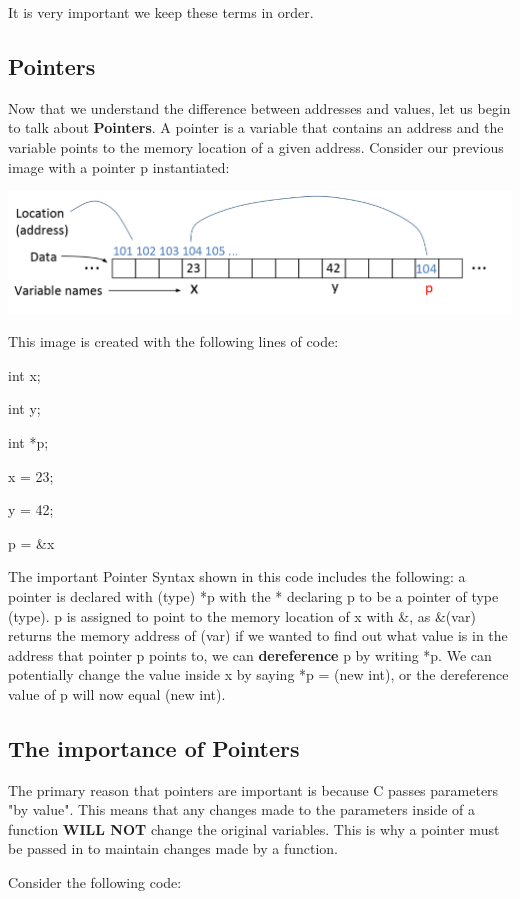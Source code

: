 \documentclass[letterpaper]{article}
\theoremstyle{remark}
\begin{document}
It is very important we keep these terms in order.

\subsection{Pointers}
Now that we understand the difference between addresses and values, let us begin to talk about \textbf{Pointers}. A pointer is a variable that contains an address and the variable points to the memory location of a given address. Consider our previous image with a pointer p instantiated:

\includegraphics[scale=.5]{pointer}

This image is created with the following lines of code:

    int x;

    int y;

    int *p;

    x = 23;

    y = 42;

    p = &x
    
The important Pointer Syntax shown in this code includes the following: a pointer is declared with 
(type) *p with the * declaring p to be a pointer of type (type). p is assigned to point to the memory location of x with &, as &(var) returns the memory address of (var) if we wanted to find out what value is in the address that pointer p points to, we can \textbf{dereference} p by writing *p. We can potentially change the value inside x by saying *p = (new int), or the dereference value of p will now equal (new int).

\subsection{The importance of Pointers}
The primary reason that pointers are important is because C passes parameters "by value". This means that any changes made to the parameters inside of a function \textbf{WILL NOT} change the original variables. This is why a pointer must be passed in to maintain changes made by a function.

Consider the following code:
\end{document}
